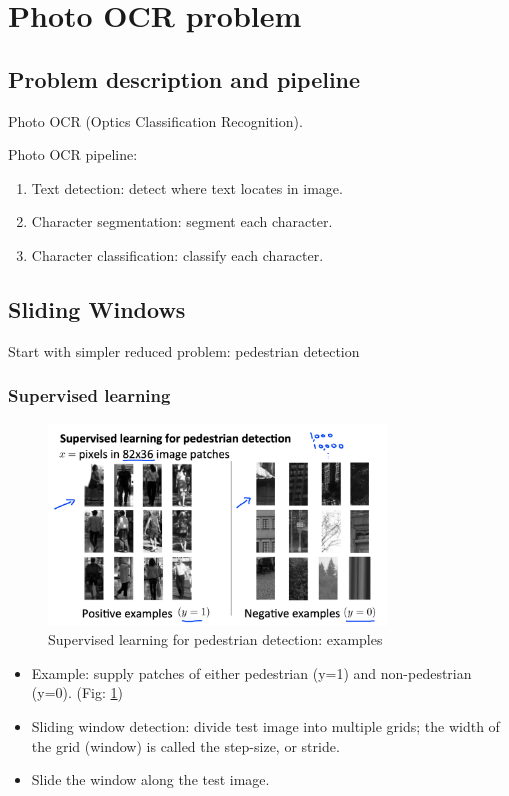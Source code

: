\section{Photo OCR problem}
\subsection{Problem description and pipeline}
Photo OCR (Optics Classification Recognition). 
\par Photo OCR pipeline: 
\begin{enumerate}
    \item Text detection: detect where text locates in image. 
    \item Character segmentation: segment each character.
    \item Character classification: classify each character.
\end{enumerate}
\subsection{Sliding Windows}
    Start with simpler reduced problem: pedestrian detection
    \subsubsection{Supervised learning}
    \begin{figure}[htpb]
        \centering
        \includegraphics[width=0.8\textwidth]{image/pedestrian-example.png}
        \caption{Supervised learning for pedestrian detection: examples}
        \label{fig:pedestrian-example}
    \end{figure}

    \begin{itemize}
        \item Example: supply patches of either pedestrian (y=1)  and non-pedestrian (y=0). (Fig: \ref{fig:pedestrian-example})
        \item Sliding window detection: divide test image into multiple grids; the width of the grid (window) is called the step-size, or stride. 
        \item Slide the window along the test image. 
    \end{itemize}

